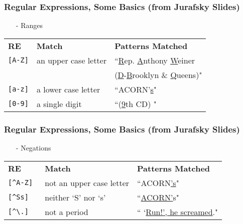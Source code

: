  \begin{frame}[fragile] 
\frametitle{Regular Expressions, Some Basics (from Jurafsky Slides) } 
\begin{itemize}
\item[-] Ranges 
\end{itemize}
\begin{center}
\begin{tabular} {lll} 
\textbf{RE} & \textbf{Match} & \textbf{Patterns Matched}\\
{\tt [A-Z]}  & an upper case letter   & ``\underline{R}ep. \underline{A}nthony \underline{W}einer\\
  &    &   (\underline{D}-\underline{B}rooklyn \& \underline{Q}ueens)" \\
{\tt [a-z]}  & a lower case letter &   ``ACORN'\underline{s}" \\
{\tt [0-9]}  & a single digit  & ``(\underline{9}th CD) " 
\end{tabular}
\end{center}
\end{frame}


 \begin{frame}[fragile]
\frametitle{Regular Expressions, Some Basics (from Jurafsky Slides) } 
\begin{itemize}
\item[-] Negations 
\end{itemize}
\begin{center}
\begin{tabular}{lll}
\textbf{RE} & \textbf{Match} & \textbf{Patterns Matched}\\
{\tt [\^{}A-Z] } & not an upper case letter &  ``ACORN\alert{\underline{'}\underline{s}}" \\
{\tt[\^{}Ss] } & neither `S' nor `s' & ``\alert{\underline{ACORN'}}s" \\
{\tt[\^{}\textbackslash.] } & not a period & `` `\underline{Run!', he screamed}." \\
\end{tabular}
\end{center}
\end{frame}

